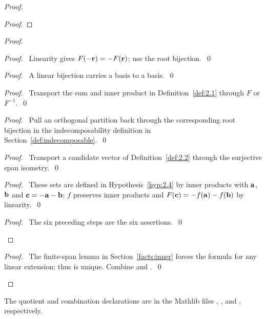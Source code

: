 \begin{proof}
\begin{proof}
 \end{proof}
 \begin{proof}
  \begin{proof}\pf\ Linearity gives $F(-{\mathbf r})=-F({\mathbf r})$; use the root bijection.~\qed\end{proof}
  \begin{proof}\pf\ A linear bijection carries a basis to a basis.~\qed\end{proof}
  \begin{proof}\pf\ Transport the sum and inner product in Definition~\ref{def:2.1}
   through $F$ or $F^{-1}$.~\qed\end{proof}
  \begin{proof}\pf\ Pull an orthogonal partition back through the corresponding
   root bijection in the indecomposability definition in Section~\ref{def:indecomposable}.~\qed\end{proof}
  \begin{proof}\pf\ Transport a candidate vector of Definition~\ref{def:2.2}
   through the surjective span isometry.~\qed\end{proof}
  \begin{proof}\pf\ These sets are defined in Hypothesis~\ref{hyp:2.4} by inner products
   with ${\mathbf a}$, ${\mathbf b}$ and ${\mathbf c}=-{\mathbf a}-{\mathbf b}$; $f$ preserves inner products and
   $F({\mathbf c})=-f({\mathbf a})-f({\mathbf b})$ by linearity.~\qed\end{proof}
  \qedstep
  \begin{proof}\pf\ The six preceding steps are the six assertions.~\qed\end{proof}
 \end{proof}
 \qedstep
 \begin{proof}\pf\ The finite-span lemma in Section~\ref{facts:inner} forces the formula
  for any linear extension; thus  is unique. Combine
   and .~\qed\end{proof}
\end{proof}
\begingroup\raggedright
The quotient and combination declarations are in the Mathlib files
, ,
and , respectively.\par
\endgroup

